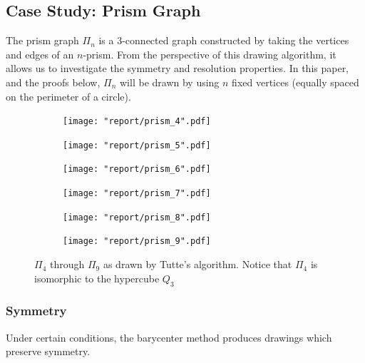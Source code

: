 \documentclass[11pt]{report}
\begin{document}
\subsection{Case Study: Prism Graph}
The prism graph $\Pi_{n}$ is a 3-connected graph constructed by taking the vertices and edges of an $n$-prism. From the perspective of this drawing algorithm, it allows us to investigate the symmetry and resolution properties. In this paper, and the proofs below, $\Pi_{n}$ will be drawn by using $n$ fixed vertices (equally spaced on the perimeter of a circle).

\begin{figure}[H]
    \centering
    
    \begin{subfigure}{.3\textwidth}
        \texttt{[image: "report/prism\_4".pdf]}
    \end{subfigure}
    \begin{subfigure}{.3\textwidth}
        \texttt{[image: "report/prism\_5".pdf]}
    \end{subfigure}
    \begin{subfigure}{.3\textwidth}
        \texttt{[image: "report/prism\_6".pdf]}
    \end{subfigure}

    \begin{subfigure}{.3\textwidth}
        \texttt{[image: "report/prism\_7".pdf]}
    \end{subfigure}
    \begin{subfigure}{.3\textwidth}
        \texttt{[image: "report/prism\_8".pdf]}
    \end{subfigure}
    \begin{subfigure}{.3\textwidth}
        \texttt{[image: "report/prism\_9".pdf]}
    \end{subfigure}
    \caption{$\Pi_4$ through $\Pi_{9}$ as drawn by Tutte's algorithm. Notice that $\Pi_4$ is isomorphic to the hypercube $Q_3$}
\end{figure}

\subsubsection{Symmetry}
Under certain conditions, the barycenter method produces drawings which preserve symmetry.
\end{document}
